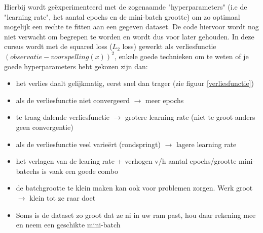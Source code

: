 \documentclass[10pt,a4paper,twoside]{article}
\begin{document}
Hierbij wordt geëxperimenteerd met de zogenaamde "hyperparameters" (i.e de "learning rate", het aantal epochs en de mini-batch grootte) om zo optimaal mogelijk een rechte te fitten aan een gegeven dataset. De code hiervoor wordt nog niet verwacht om begrepen te worden en wordt dus voor later gehouden. In deze cursus wordt met de squared loss ($L_2$ loss) gewerkt als verliesfunctie $(observatie - voorspelling(x))^2$, enkele goede technieken om te weten of je goede hyperparameters hebt gekozen zijn dan:
\begin{itemize}
	\item het verlies daalt gelijkmatig, eerst snel dan trager (zie figuur \ref{verliesfunctie})
	\item als de verliesfunctie niet convergeerd $\rightarrow$ meer epochs
	\item te traag dalende verliesfunctie $\rightarrow$ grotere learning rate (niet te groot anders geen convergentie)
	\item als de verliesfunctie veel varieërt (rondspringt) $\rightarrow$ lagere learning rate
	\item het verlagen van de learing rate + verhogen v/h aantal epochs/grootte mini-batcehs is vaak een goede combo
	\item de batchgrootte te klein maken kan ook voor problemen zorgen. Werk groot $\rightarrow$ klein tot ze raar doet
	\item Soms is de dataset zo groot dat ze ni in uw ram past, hou daar rekening mee en neem een geschikte mini-batch
\end{itemize}
\end{document}
